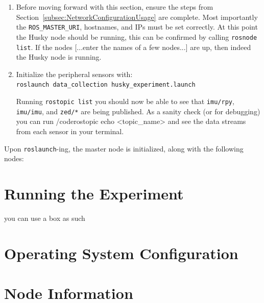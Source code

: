 \documentclass[
	12pt, %
]{fphw}
\newcommand{\code}[1]{\colorbox{light-gray}{\texttt{#1}}}
\begin{document}
\begin{enumerate}
\item Before moving forward with this section, ensure the steps from Section~\ref{subsec:NetworkConfigurationUsage} are complete. Most importantly the \code{ROS\_MASTER\_URI}, hostnames, and IPs must be set correctly. At this point the Husky node should be running, this can be confirmed by calling \code{rosnode list}. If the nodes [...enter the names of a few nodes...] are up, then indeed the Husky node is running.
	
\item Initialize the peripheral sensors with: \\
  \code{roslaunch data\_collection husky\_experiment.launch}
  
\qquad Running \code{rostopic list} you should now be able to see that \code{imu/rpy}, \code{imu/imu}, and \code{zed/*} are being published. As a sanity check (or for debugging) you can run /code{rostopic echo <topic\_name>} and see the data streams from each sensor in your terminal.

\end{enumerate}

Upon \code{roslaunch}-ing, the master node is initialized, along with the following nodes:



\section{Running the Experiment}

\begin{problem}
you can use a box as such
\end{problem}

\cleardoublepage
\appendix

\section{Operating System Configuration}
\label{app:OperatingSystemConfiguration}

\section{Node Information}
\label{app:NodeInformation}
\end{document}
